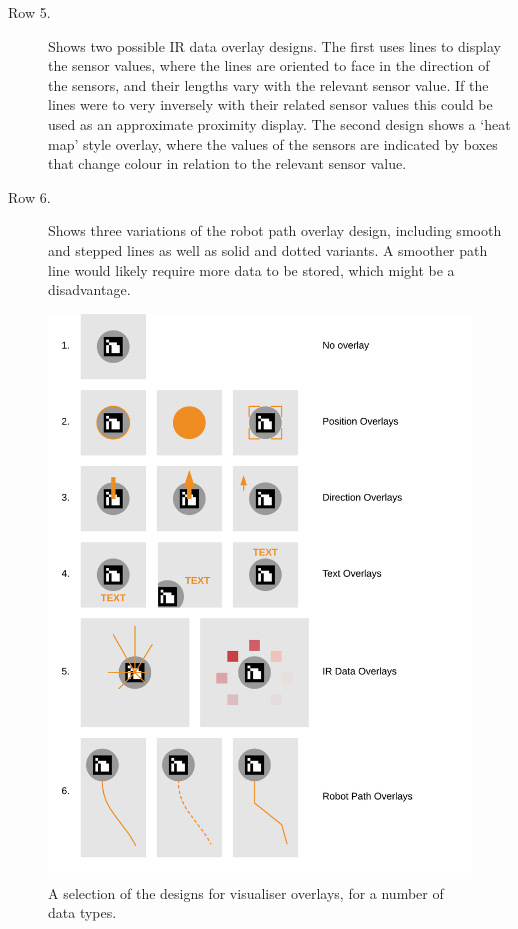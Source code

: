 \begin{description}
\item [Row 5.] Shows two possible IR data overlay designs. The first uses lines to display the sensor values, where the lines are oriented to face in the direction of the sensors, and their lengths vary with the relevant sensor value. If the lines were to very inversely with their related sensor values this could be used as an approximate proximity display. The second design shows a `heat map' style overlay, where the values of the sensors are indicated by boxes that change colour in relation to the relevant sensor value. 

\item [Row 6.] Shows three variations of the robot path overlay design, including smooth and stepped lines as well as solid and dotted variants. A smoother path line would likely require more data to be stored, which might be a disadvantage.
\end{description}

\begin{figure}
	\centering
	\includegraphics[scale=1]{Figures/OverlayDesigns.png}
	\decoRule
	\caption[Visualiser Overlay Designs]{A selection of the designs for visualiser overlays, for a number of data types.}
	\label{fig:OverlayDesigns}
\end{figure}

